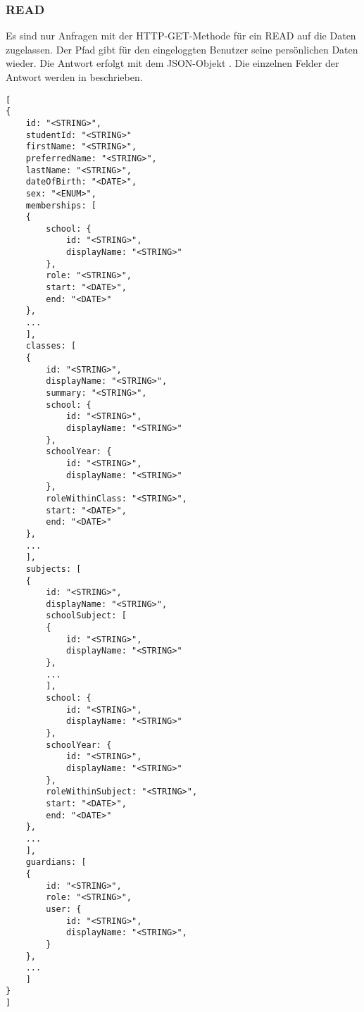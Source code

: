 \subsubsection{READ}
\label{sec:rest:api:user:read}
Es sind nur Anfragen mit der HTTP-GET-Methode für ein READ auf die Daten zugelassen.
Der Pfad gibt für den eingeloggten Benutzer seine persönlichen Daten wieder.
Die Antwort erfolgt mit dem JSON-Objekt . 
Die einzelnen Felder der Antwort werden in  beschrieben.

\begin{lstlisting}[caption={JSON-Antwort für einen GET-Aufruf des Pfads /api/users},label={lst:code:rest:api:user:read:ret},frame=tlrb]
[
{
	id: "<STRING>",
	studentId: "<STRING>"
 	firstName: "<STRING>",
 	preferredName: "<STRING>",
 	lastName: "<STRING>",
 	dateOfBirth: "<DATE>",
 	sex: "<ENUM>",
 	memberships: [
 	{
 		school: {
 			id: "<STRING>",
 			displayName: "<STRING>"
 		},
 		role: "<STRING>",
 		start: "<DATE>",
 		end: "<DATE>"
 	},
 	...
 	],
 	classes: [
 	{
 		id: "<STRING>",
 		displayName: "<STRING>",
 		summary: "<STRING>",
 		school: {
 			id: "<STRING>",
 			displayName: "<STRING>"
 		},
 		schoolYear: {
 			id: "<STRING>",
 			displayName: "<STRING>"
 		},
 		roleWithinClass: "<STRING>",
 		start: "<DATE>",
 		end: "<DATE>"
 	},
 	...
	],
	subjects: [
	{
		id: "<STRING>",
		displayName: "<STRING>",
		schoolSubject: [
 		{
 			id: "<STRING>",
 			displayName: "<STRING>"
 		},
 		...
 		],
 		school: {
 			id: "<STRING>",
 			displayName: "<STRING>"
 		},
 		schoolYear: {
 			id: "<STRING>",
 			displayName: "<STRING>"
 		},
 		roleWithinSubject: "<STRING>",
 		start: "<DATE>",
 		end: "<DATE>" 		
	},
	...
	],
	guardians: [
	{
		id: "<STRING>",
		role: "<STRING>",
		user: {
			id: "<STRING>",
			displayName: "<STRING>",
		}
	},
	...
	]
}
]
\end{lstlisting}

